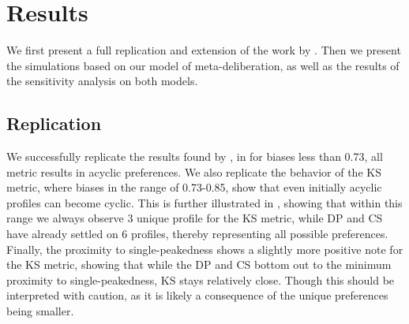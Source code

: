 \newpage
\chapter{Results}
\label{experiment_results}
We first present a full replication and extension of the work by
\citet{radDeliberationSinglePeakednessCoherent2021}. Then we present the simulations based on our model of
meta-deliberation, as well as the results of the sensitivity analysis on both
models.


\section{Replication}\label{sec: replication} We successfully replicate the results found by
\citet{radDeliberationSinglePeakednessCoherent2021},  in 
for biases less than 0.73, all metric results in acyclic
preferences. We also replicate the behavior of the KS metric, where biases in
the range of 0.73-0.85, show that even initially acyclic profiles can become
cyclic. This is further illustrated in , showing that within this
range we always observe 3 unique profile for the KS metric, while DP and CS
have already settled on 6 profiles, thereby representing all possible
preferences. Finally, the proximity to single-peakedness shows a slightly more
positive note for the KS metric, showing that while the DP and CS bottom out to
the minimum proximity to single-peakedness, KS stays relatively close. Though
this should be interpreted with caution, as it is likely a consequence of the
unique preferences being smaller.

